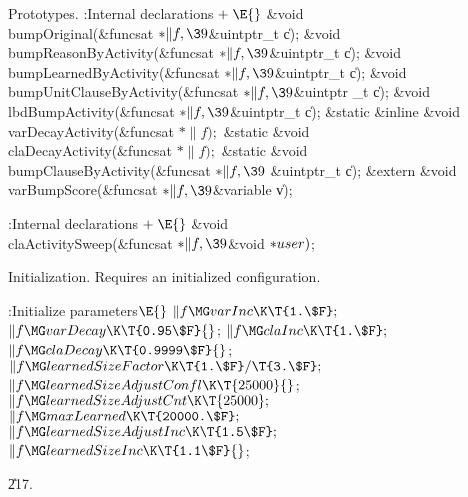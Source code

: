 {{{{{Prototypes.
\Y\B\4:Internal declarations\X${}\mathrel+\E{}$\6
\&{void} \\{bumpOriginal}(\&{funcsat} ${}{*}\|f,\39{}$\&{uintptr\_t} \|c);\6
\&{void} \\{bumpReasonByActivity}(\&{funcsat} ${}{*}\|f,\39{}$\&{uintptr\_t} %
\|c);\6
\&{void} \\{bumpLearnedByActivity}(\&{funcsat} ${}{*}\|f,\39{}$\&{uintptr\_t} %
\|c);\6
\&{void} \\{bumpUnitClauseByActivity}(\&{funcsat} ${}{*}\|f,\39{}$\&{uintptr%
\_t} \|c);\6
\&{void} \\{lbdBumpActivity}(\&{funcsat} ${}{*}\|f,\39{}$\&{uintptr\_t} \|c);\6
\&{static} \&{inline} \&{void} \\{varDecayActivity}(\&{funcsat} ${}{*}\|f);{}$\6
\&{static} \&{void} \\{claDecayActivity}(\&{funcsat} ${}{*}\|f);{}$\6
\&{static} \&{void} \\{bumpClauseByActivity}(\&{funcsat} ${}{*}\|f,\39{}$%
\&{uintptr\_t} \|c);\6
\&{extern} \&{void} \\{varBumpScore}(\&{funcsat} ${}{*}\|f,\39{}$\&{variable} %
\|v);\par
\fi

\Y\B\4:Internal declarations\X${}\mathrel+\E{}$\6
\&{void} \\{claActivitySweep}(\&{funcsat} ${}{*}\|f,\39{}$\&{void} ${}{*}%
\\{user}){}$;\par
\fi

Initialization. Requires an initialized configuration.

\Y\B\4:Initialize parameters\X${}\E{}$\6
$\|f\MG\\{varInc}\K\T{1.\$F};{}$\6
${}\|f\MG\\{varDecay}\K\T{0.95\$F}{}$;\6
${}\|f\MG\\{claInc}\K\T{1.\$F};{}$\6
${}\|f\MG\\{claDecay}\K\T{0.9999\$F}{}$;\6
${}\|f\MG\\{learnedSizeFactor}\K\T{1.\$F}/\T{3.\$F};{}$\6
${}\|f\MG\\{learnedSizeAdjustConfl}\K\T{25000}{}$;\6
${}\|f\MG\\{learnedSizeAdjustCnt}\K\T{25000};{}$\6
${}\|f\MG\\{maxLearned}\K\T{20000.\$F};{}$\6
${}\|f\MG\\{learnedSizeAdjustInc}\K\T{1.5\$F};{}$\6
${}\|f\MG\\{learnedSizeInc}\K\T{1.1\$F}{}$;\par
\U217.\fi

}}}}}
